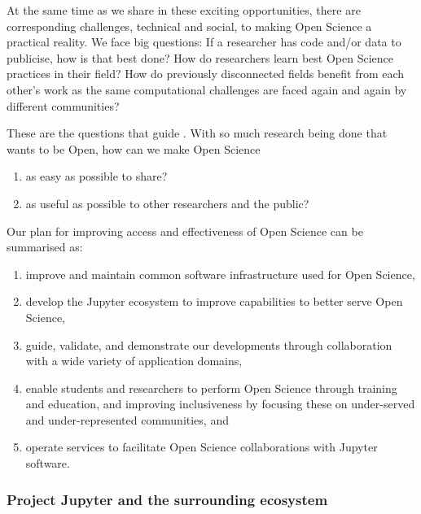 At the same time as we share in these exciting opportunities, there
are corresponding challenges, technical and social, to making Open
Science a practical reality.  We face big questions: If a researcher
has code and/or data to publicise, how is that best done?  How do
researchers learn best Open Science practices in their field?  How do
previously disconnected fields benefit from each other's work as the
same computational challenges are faced again and again by different
communities?

These are the questions that guide \TheProject.
With so much research being done that wants to be Open,
how can we make Open Science

\begin{enumerate}
    \item as easy as possible to share?
    \item as useful as possible to other researchers and the public?
\end{enumerate}

\noindent Our plan for improving access and effectiveness of Open Science can be summarised as:

\begin{enumerate}
\item improve and maintain common software infrastructure used for
  Open Science,
\item develop the Jupyter ecosystem to improve capabilities to better
  serve Open Science,
\item guide, validate, and demonstrate our developments through
  collaboration with a wide variety of application domains,
\item enable students and researchers to perform Open Science through
  training and education, and improving inclusiveness by focusing
  these on under-served and under-represented communities, and
\item operate services to facilitate Open Science collaborations with
  Jupyter software.
\end{enumerate}

\medskip

\subsubsection{Project Jupyter and the surrounding ecosystem}
\label{sec:project-jupyter}

